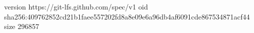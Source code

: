 version https://git-lfs.github.com/spec/v1
oid sha256:409762852cd21b1faee557202fd8a8e09e6a96db4af6091cde867534871acf44
size 296857
